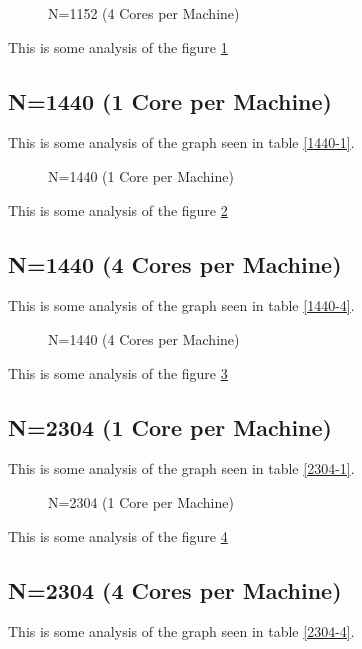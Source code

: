\documentclass[a4paper]{article}
\begin{document}
\begin{figure}
    
    \caption{N=1152 (4 Cores per Machine)}
    \label{fig:1152_4}
\end{figure}

This is some analysis of the figure \ref{fig:1152_4}

\subsection{N=1440 (1 Core per Machine)}

This is some analysis of the graph seen in table \ref{1440-1}.

\begin{figure}
    
    \caption{N=1440 (1 Core per Machine)}
    \label{fig:1440_1}
\end{figure}

This is some analysis of the figure \ref{fig:1440_1}

\subsection{N=1440 (4 Cores per Machine)}

This is some analysis of the graph seen in table \ref{1440-4}.

\begin{figure}
    
    \caption{N=1440 (4 Cores per Machine)}
    \label{fig:1440_4}
\end{figure}

This is some analysis of the figure \ref{fig:1440_4}

\subsection{N=2304 (1 Core per Machine)}

This is some analysis of the graph seen in table \ref{2304-1}.

\begin{figure}
    
    \caption{N=2304 (1 Core per Machine)}
    \label{fig:2304_1}
\end{figure}

This is some analysis of the figure \ref{fig:2304_1}

\subsection{N=2304 (4 Cores per Machine)}

This is some analysis of the graph seen in table \ref{2304-4}.
\end{document}

